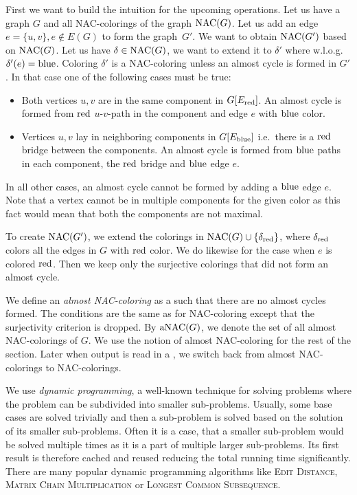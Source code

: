 First we want to build the intuition for the upcoming operations.
Let us have a graph \( G \) and all NAC-colorings of the graph \( \operatorname{NAC}(G) \).
Let us add an edge \( e = \{u, v\}, e \not\in E(G) \) to form the graph~\( G' \).
We want to obtain \( \operatorname{NAC}(G') \) based on \( \operatorname{NAC}(G) \).
%
Let us have \( \delta \in \operatorname{NAC}(G) \),
we want to extend it to \( \delta' \) where w.l.o.g.\ \( \delta'(e) = \text{blue} \).
Coloring \( \delta' \) is a NAC-coloring unless an almost cycle is formed in \( G' \).
In that case one of the following cases must be true:
%
\begin{itemize}
	\item Both vertices \( u, v \) are in the same component in \( G[E_\text{red}] \).
	      An almost cycle is formed
	      from \( \text{red} \) \( u \)-\( v \)-path in the component
	      and edge \( e \) with \( \text{blue} \) color.
	\item Vertices \( u, v \) lay in neighboring components in \( G[E_\text{blue}] \)
	      i.e.\ there is a \( \text{red} \) bridge between the components.
	      An almost cycle is formed from \( \text{blue} \) paths in each component,
	      the \( \text{red} \) bridge and \( \text{blue} \) edge \( e \).
\end{itemize}
%
In all other cases, an almost cycle cannot be formed by adding a \( \text{blue} \) edge \( e \).
Note that a vertex cannot be in multiple components for the given color
as this fact would mean that both the components are not maximal.

To create \( \operatorname{NAC}(G') \), we extend the colorings
in \( \operatorname{NAC}(G) \cup \{ \delta_{\text{red}} \} \), where \( \delta_{\text{red}} \)
colors all the edges in \( G \) with \( \text{red} \) color.
We do likewise for the case when \( e \) is colored \( \text{red} \).
Then we keep only the surjective colorings that did not form an almost cycle.

We define an \emph{almost NAC-coloring}
as a \rbcol{} such that there are no almost cycles formed.
The conditions are the same as for NAC-coloring
except that the surjectivity criterion is dropped.
By \( \operatorname{aNAC}(G) \), we denote the set of all almost NAC-colorings of \( G \).
We use the notion of almost NAC-coloring for the rest of the section.
Later when output is read in a \RootNode{},
we switch back from almost NAC-colorings to NAC-colorings.

We use \emph{dynamic programming}, a well-known technique for solving problems
where the problem can be subdivided into smaller sub-problems.
Usually, some base cases are solved trivially and then a sub-problem
is solved based on the solution of its smaller sub-problems.
Often it is a case, that a smaller sub-problem would be solved multiple times
as it is a part of multiple larger sub-problems.
Its first result is therefore cached and reused reducing the total running time significantly.
There are many popular dynamic programming algorithms
like \textsc{Edit Distance}, \textsc{Matrix Chain Multiplication} or \textsc{Longest Common Subsequence}.

